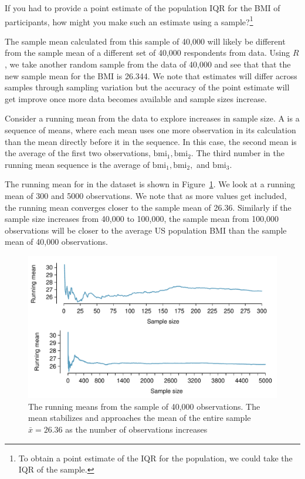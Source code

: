 \begin{exercise}
If you had to provide a point estimate of the population IQR for the BMI of participants, how might you make such an estimate using a sample?\footnote{To obtain a point estimate of the IQR for the population, we could take the IQR of the sample.}


\end{exercise}

The sample mean calculated from this  sample of 40,000 will likely be different from the sample mean of a different set of 40,000 respondents from  data. Using $R$, we take another random sample from the  data of 40,000 and see that that the new sample mean for the BMI is 26.344. We note that estimates will differ across samples through sampling variation but the accuracy of the point estimate will get improve once more data becomes available and sample sizes increase.

Consider a running mean from the  data to explore increases in sample size. A  is a sequence of means, where each mean uses one more observation in its calculation than the mean directly before it in the sequence. In this case, the second mean is the average of the first two observations, $\mathrm{bmi}_1, \mathrm{bmi}_2$. The third number in the running mean sequence is the average of $\mathrm{bmi}_1, \mathrm{bmi}_2,$ and $\mathrm{bmi}_3$. 

The running mean for  in the  dataset is shown in Figure~\ref{BMIRunningMean}. We look at a running mean of 300 and 5000 observations. We note that as more values get included, the running mean converges closer to the sample mean of 26.36. Similarly if the sample size increases from 40,000 to 100,000, the sample mean from 100,000 observations will be closer to the average US population BMI than the sample mean of 40,000 observations. 

\begin{figure}
   \centering
   \includegraphics[width=\textwidth]{ch_inference_foundations_oi_biostat/figures/brfssBMIRunningMean/brfssBMIRunningMean}
   \caption{The running means from the  sample of 40,000 observations. The mean stabilizes and approaches the mean of the entire sample $\bar{x} = 26.36$ as the number of observations increases}
      \label{BMIRunningMean}
\end{figure}

